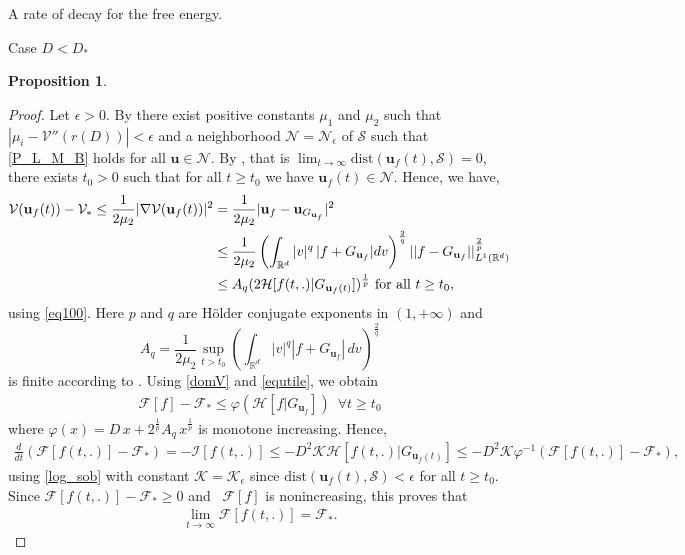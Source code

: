 \documentclass[reqno]{amsart} %
\newtheorem{proposition}{Proposition}[section]
\begin{document}
\begin{section}{A rate of decay for the free energy.}
\begin{subsection}{Case \texorpdfstring{$D<D_*$}{DD*}}
\begin{proposition}
\end{proposition}



\begin{proof}
Let $\epsilon>0$. By  there exist positive constants $\mu_1$ and $\mu_2$ such that $|\mu_i-\mathcal{V}''(r(D))|<\epsilon$ and a neighborhood $\mathcal{N}=\mathcal{N}_{\epsilon}$ of $\mathcal{S}$ such that
\eqref{P_L_M_B} holds for all $\mathbf{u}\in \mathcal{N}$.
By , that is $\lim_{t\rightarrow \infty}\mathrm{dist}(\mathbf{u}_{f}(t),\mathcal{S})=0$, there exists $t_0>0$ such that for all $t\geq t_0$ we have $\mathbf{u}_{f}(t) \in \mathcal{N}$. Hence, we have,
\begin{align}
\label{domV}
    \mathcal{V}(\mathbf{u}_{f}(t))-\mathcal{V}_* \leq \frac{1}{2\mu_2}|\nabla\mathcal{V}(\mathbf{u}_{f}(t))|^2 &=\frac{1}{2\mu_2}|\mathbf{u}_{f}-\mathbf{u}_{G_{\mathbf{u}_{f}}}|^2 \notag \\
    &\leq \frac{1}{2\mu_2} \left(\int_{\mathbb{R}^d} |v|^q\,|f+G_{\mathbf{u}_{f}}|dv \right)^{\frac{2}{q}}\vert \vert f-G_{\mathbf{u}_{f}}\vert \vert _{L^1(\mathbb{R}^d)}^{\frac{2}{p}} \notag\\
    & \leq A_q (2\mathcal{H}[f(t,.)|G_{\mathbf{u}_{f}(t)}])^{\frac{1}{p}} \text{ for all } t\geq t_0,
\end{align}
using \eqref{eq100}.
Here $p$ and $q$ are  Hölder conjugate exponents in $(1,+\infty)$ and  $$A_q= \frac{1}{2\mu_2}\sup_{t>t_0}{\left(\int_{\mathbb{R}^d} |v|^q|f+G_{\mathbf{u}_{f}}|\,dv \right)^{\frac{2}{q}}} $$  is finite according to . Using  \eqref{domV} and \eqref{equtile}, we obtain 
\begin{align}
\label{eqbof}
    \mathcal{F}[f]-\mathcal{F}_* \leq  \varphi(\mathcal{H}[f|G_{\mathbf{u}_{f}}]) \,\,\,\forall
t\geq t_0
\end{align}
where $\varphi(x)=D\,x + 2^{\frac{1}{p}}A_q \,x^{\frac{1}{p}}$ is monotone increasing. Hence,
\begin{align}
\label{gronwall}
    \frac{d}{dt} (\mathcal{F}[f(t,.)]-\mathcal{F}_*)=-\mathcal{I}[f(t,.)] 
    \leq  -D^2 \mathcal{K} \mathcal{H}[f(t,.)|G_{\mathbf{u}_{f}(t)}]
    \leq -D^2 \mathcal{K} \varphi^{-1}\left(\mathcal{F}[f(t,.)]-\mathcal{F}_*\right),
\end{align}
using \eqref{log_sob} with constant $\mathcal{K}=\mathcal{K}_{\epsilon}$ since $\mathrm{dist}(\mathbf{u}_{f}(t),\mathcal{S})<\epsilon$ for all $t \geq t_0$.
Since $\mathcal{F}[f(t,.)]-\mathcal{F}_* \geq 0$ and ~$\mathcal{F}[f]$ is nonincreasing, this proves that
\begin{align}
\label{limF}
    \lim_{t \rightarrow \infty}\mathcal{F}[f(t,.)]=\mathcal{F}_*.
\end{align}





\end{proof}
\end{subsection}
\end{section}
\end{document}
